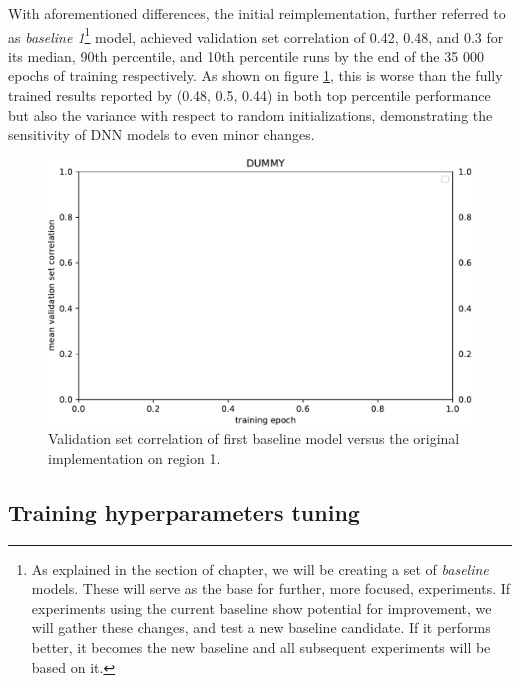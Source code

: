 With aforementioned differences, the initial reimplementation, further referred to as \emph{baseline 1}\footnote{As explained in the  section of  chapter, we will be creating a set of \emph{baseline} models. These will serve as the base for further, more focused, experiments. If experiments using the current baseline show potential for improvement, we will gather these changes, and test a new baseline candidate. If it performs better, it becomes the new baseline and all subsequent experiments will be based on it.} model, achieved validation set correlation of 0.42, 0.48, and 0.3 for its median, 90th percentile, and 10th percentile runs by the end of the 35 000 epochs of training respectively. As shown on figure \ref{fig:5.1.1.1}, this is worse than the fully trained results reported by \citeauthor{antolik} (0.48, 0.5, 0.44) in both top percentile performance but also the variance with respect to random initializations, demonstrating the sensitivity of DNN models to even minor changes.

\begin{figure}[H]
    \centering
    \includegraphics[width=1\textwidth]{../figures/05_dummy}
    \caption[Experiment 1.1.1]{Validation set correlation of first baseline model versus the original \cite{antolik} implementation on region 1\protect\footnotemark.}
    \label{fig:5.1.1.1}
\end{figure}

\subsection{Training hyperparameters tuning}
